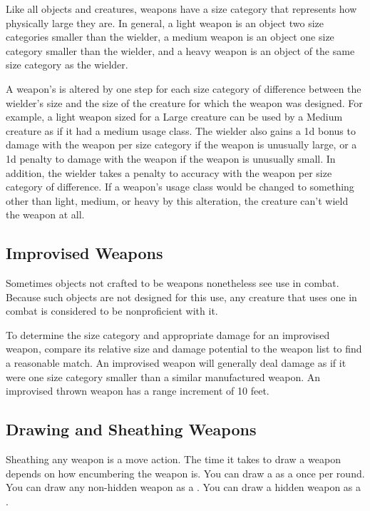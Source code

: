              Like all objects and creatures, weapons have a size category that represents how physically large they are. In general, a light weapon is an object two size categories smaller than the wielder, a medium weapon is an object one size category smaller than the wielder, and a heavy weapon is an object of the same size category as the wielder.

            \label{Inappropriately Sized Weapons} A weapon's  is altered by one step for each size category of difference between the wielder's size and the size of the creature for which the weapon was designed.
            For example, a light weapon sized for a Large creature can be used by a Medium creature as if it had a medium usage class.
            The wielder also gains a \plus1d bonus to damage with the weapon per size category if the weapon is unusually large, or a \minus1d penalty to damage with the weapon if the weapon is unusually small.
            In addition, the wielder takes a  penalty to accuracy with the weapon per size category of difference.
            If a weapon's usage class would be changed to something other than light, medium, or heavy by this alteration, the creature can't wield the weapon at all.

    \subsection{Improvised Weapons}\label{Improvised Weapons} Sometimes objects not crafted to be weapons nonetheless see use in combat. Because such objects are not designed for this use, any creature that uses one in combat is considered to be nonproficient with it.

        To determine the size category and appropriate damage for an improvised weapon, compare its relative size and damage potential to the weapon list to find a reasonable match. An improvised weapon will generally deal damage as if it were one size category smaller than a similar manufactured weapon. An improvised thrown weapon has a range increment of 10 feet.

    \subsection{Drawing and Sheathing Weapons}\label{Drawing and Sheathing Weapons}
        Sheathing any weapon is a move action.
        The time it takes to draw a weapon depends on how encumbering the weapon is.
        You can draw a  as a  once per round.
        You can draw any non-hidden weapon as a .
        You can draw a hidden weapon as a .

